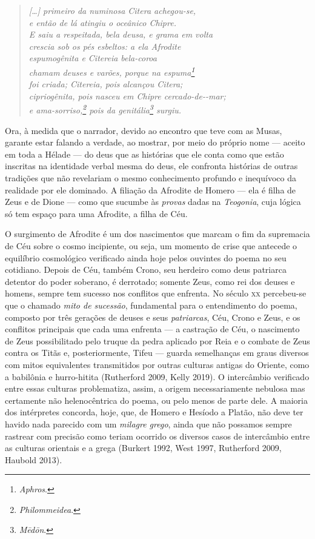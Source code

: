 \begin{verse}
\textit{
{[}\ldots{}{]} primeiro da numinosa Citera achegou-se,\\
e então de lá atingiu o oceânico Chipre.\\
E saiu a respeitada, bela deusa, e grama em volta\\
crescia sob os pés esbeltos: a ela Afrodite\\ 
espumogênita e Citereia bela-coroa\\
chamam deuses e varões, porque na espuma\footnote{\textit{Aphros}.}\\
foi criada; Citereia, pois alcançou Citera;\\
cipriogênita, pois nasceu em Chipre cercado-de-\qb{}-mar;\\
e ama-sorriso,\footnote{\textit{Philommeidea}.} pois da genitália\footnote{\textit{Mēdōn}.} surgiu.
}
\end{verse}

Ora, à medida que o narrador, devido ao encontro que teve com as Musas,
garante estar falando a verdade, ao mostrar, por meio do próprio nome ---
aceito em toda a Hélade --- do deus que as histórias que ele conta como
que estão inscritas na identidade verbal mesma do deus, ele confronta
histórias de outras tradições que não revelariam o mesmo
conhecimento profundo e inequívoco da realidade por ele dominado. A
filiação da Afrodite de Homero --- ela é filha de Zeus e de Dione --- como
que sucumbe às \textit{provas} dadas na \textit{Teogonia}, cuja lógica só tem
espaço para uma Afrodite, a filha de Céu.

O surgimento de Afrodite é um dos nascimentos que marcam o fim da
supremacia de Céu sobre o cosmo incipiente, ou seja, um momento de crise
que antecede o equilíbrio cosmológico verificado ainda hoje pelos
ouvintes do poema no seu cotidiano. Depois de Céu, também Crono, seu
herdeiro como deus patriarca detentor do poder soberano, é derrotado;
somente Zeus, como rei dos deuses e homens, sempre tem sucesso nos
conflitos que enfrenta. No século \textsc{xx} percebeu-se que o chamado \textit{mito de
sucessão}, fundamental para o entendimento do poema, composto por três
gerações de deuses e seus \textit{patriarcas}, Céu, Crono e Zeus, e os
conflitos principais que cada uma enfrenta --- a castração de Céu, o
nascimento de Zeus possibilitado pelo truque da pedra aplicado por Reia
e o combate de Zeus contra os Titãs e, posteriormente, Tifeu --- guarda
semelhanças em graus diversos com mitos equivalentes transmitidos por
outras culturas antigas do Oriente, como a babilônia e hurro-hitita
(Rutherford 2009, Kelly 2019). O intercâmbio verificado entre essas
culturas problematiza, assim, a origem necessariamente nebulosa mas
certamente não helenocêntrica do poema, ou pelo menos de parte dele. A
maioria dos intérpretes concorda, hoje, que, de Homero e Hesíodo a
Platão, não deve ter havido nada parecido com um \textit{milagre grego},
ainda que não possamos sempre rastrear com precisão como teriam ocorrido
os diversos casos de intercâmbio entre as culturas orientais e a grega
(Burkert 1992, West 1997, Rutherford 2009, Haubold 2013).


